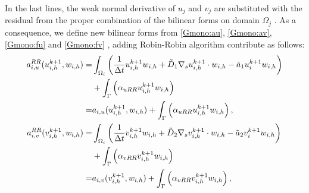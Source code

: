 In the last lines, the weak normal derivative of $u_j$ and $v_j$ are substituted with the residual from the proper combination of the bilinear forms on domain $\Omega_j$ \cite{DD:QuarteroniValli}.
As a consequence, we define new bilinear forms from \eqref{Gmono:au}, \eqref{Gmono:av}, \eqref{Gmono:fu} and  \eqref{Gmono:fv} , adding Robin-Robin algorithm contribute as follows:
\begin{equation}\label{eq:au&avRR}
\begin{aligned}
    a_{i,u}^{RR}(u_{i,h}^{k+1}, w_{i,h}) = & \int_{\Omega_i} \left( \frac{1}{\Delta t} u_{i,h}^{k+1} w_{i,h} + \Tilde{D}_1 \nabla_s u_{i,h}^{k+1} \cdot w_{i,h} - \Tilde{a}_1 u_i^{k+1} w_{i,h} \right)  \\
    & + \int_{\Gamma} \left(\alpha_{uRR} u_{i,h}^{k+1} w_{i,h} \right) \\
    = & a_{i,u}(u_{i,h}^{k+1}, w_{i,h}) + \int_{\Gamma} \left(\alpha_{uRR} u_{i,h}^{k+1} w_{i,h} \right), \\
    a_{i,v}^{RR}(v_{i,h}^{k+1}, w_{i,h}) = & \int_{\Omega_i} \left(\frac{1}{\Delta t} v_{i,h}^{k+1} w_{i,h} + \Tilde{D}_2 \nabla_s v_{i,h}^{k+1} \cdot w_{i,h} - \Tilde{a}_2 v_i^{k+1} w_{i,h} \right) \\
     & + \int_{\Gamma} \left(\alpha_{vRR} v_{i,h}^{k+1} w_{i,h} \right) \\
     = & a_{i,v}(v_{i,h}^{k+1}, w_{i,h}) + \int_{\Gamma} \left(\alpha_{vRR} v_{i,h}^{k+1} w_{i,h} \right),
\end{aligned}
\end{equation}

